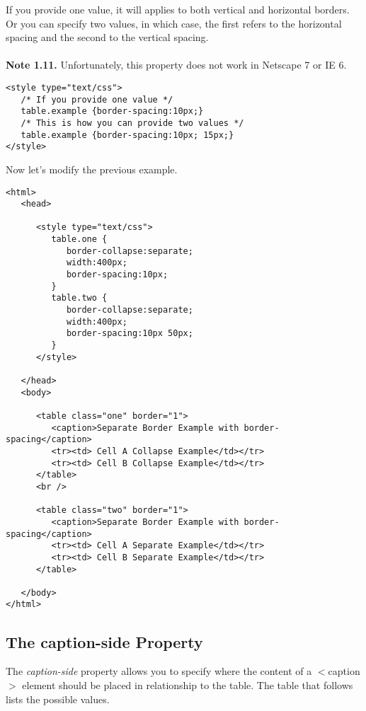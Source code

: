 \documentclass[a4paper,oneside]{book}
\numberwithin{equation}{chapter}
\begin{document}
If you provide one value, it will applies to both vertical and horizontal borders. Or you can specify two values, in which case, the first refers to the horizontal spacing and the second to the vertical spacing.\\
\\
\textbf{Note 1.11.} Unfortunately, this property does not work in Netscape 7 or IE 6.
\begin{verbatim}
<style type="text/css">
   /* If you provide one value */
   table.example {border-spacing:10px;}
   /* This is how you can provide two values */
   table.example {border-spacing:10px; 15px;}
</style>
\end{verbatim}
Now let's modify the previous example.
\begin{verbatim}
<html>
   <head>
   
      <style type="text/css">
         table.one {
            border-collapse:separate;
            width:400px;
            border-spacing:10px;
         }
         table.two {
            border-collapse:separate;
            width:400px;
            border-spacing:10px 50px;
         }
      </style>
      
   </head>
   <body>
   
      <table class="one" border="1">
         <caption>Separate Border Example with border-spacing</caption>
         <tr><td> Cell A Collapse Example</td></tr>
         <tr><td> Cell B Collapse Example</td></tr>
      </table>
      <br />
      
      <table class="two" border="1">
         <caption>Separate Border Example with border-spacing</caption>
         <tr><td> Cell A Separate Example</td></tr>
         <tr><td> Cell B Separate Example</td></tr>
      </table>
      
   </body>
</html> 
\end{verbatim}
\subsection{The caption-side Property}
The \textit{caption-side} property allows you to specify where the content of a $<$caption$>$ element should be placed in relationship to the table. The table that follows lists the possible values.
\end{document}

